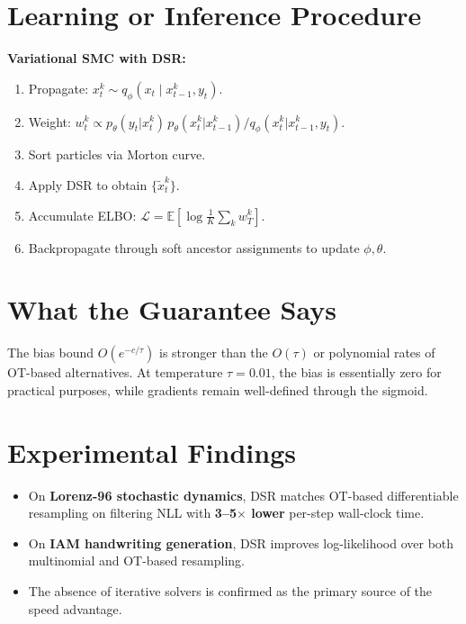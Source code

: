 \documentclass[10pt,twocolumn]{article}
\begin{document}
\section{Learning or Inference Procedure}

\textbf{Variational SMC with DSR:}
\begin{enumerate}[itemsep=2pt,parsep=0pt]
  \item Propagate: $x_t^k \sim q_\phi(x_t \mid x_{t-1}^k, y_t)$.
  \item Weight: $w_t^k \propto
    p_\theta(y_t | x_t^k)\,p_\theta(x_t^k | x_{t-1}^k)
    / q_\phi(x_t^k | x_{t-1}^k, y_t)$.
  \item Sort particles via Morton curve.
  \item Apply DSR to obtain $\{\tilde{x}_t^k\}$.
  \item Accumulate ELBO: $\mathcal{L} = \mathbb{E}[\log \frac{1}{K}\sum_k w_T^k]$.
  \item Backpropagate through soft ancestor assignments to update $\phi, \theta$.
\end{enumerate}

\section{What the Guarantee Says}

The bias bound $O(e^{-c/\tau})$ is stronger than the $O(\tau)$ or
polynomial rates of OT-based alternatives. At temperature $\tau = 0.01$,
the bias is essentially zero for practical purposes, while gradients
remain well-defined through the sigmoid.

\section{Experimental Findings}

\begin{itemize}[itemsep=2pt,parsep=0pt]
  \item On \textbf{Lorenz-96 stochastic dynamics}, DSR matches OT-based
    differentiable resampling on filtering NLL with \textbf{3--5$\times$
    lower} per-step wall-clock time.
  \item On \textbf{IAM handwriting generation}, DSR improves
    log-likelihood over both multinomial and OT-based resampling.
  \item The absence of iterative solvers is confirmed as the primary
    source of the speed advantage.
\end{itemize}
\end{document}
